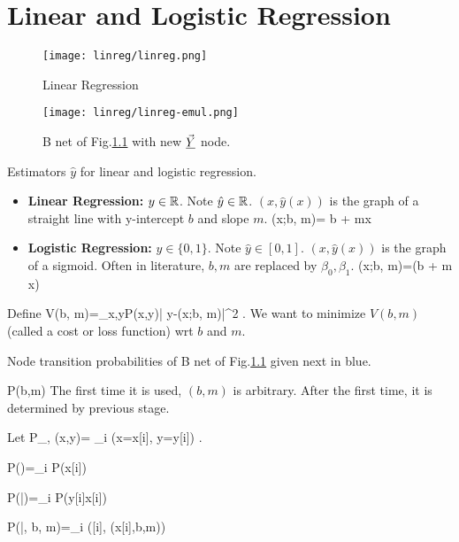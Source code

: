 \chapter{Linear and Logistic Regression}

\begin{figure}[h!]
\centering
\texttt{[image: linreg/linreg.png]}
\caption{Linear Regression} 
\label{fig-linreg}
\end{figure}

\begin{figure}[h!]
\centering
\texttt{[image: linreg/linreg-emul.png]}
\caption{B net of Fig.\ref{fig-linreg}  with new $\vec{\underline{Y}}$ node.}\label{fig-linreg-emul}
\end{figure}



Estimators $\hat{y}$ for linear and logistic regression.
\begin{itemize}
\item 

\textbf{Linear Regression:} $y\in { \mathbb{R}}$. 
Note $\hat{y}\in { \mathbb{R}}$. $(x,\hat{y}(x))$ is
the graph
of a straight line 
with y-intercept $b$ and slope $m$.
\beq
{}(x;b, m)= b + mx
\eeq

\item
\textbf{Logistic Regression:} $y\in\{0, 1\}$. Note $\hat{y}\in [0,1]$. $
(x,\hat{y}(x))$ is the graph
of a sigmoid.
 Often in literature, $b,m$ are replaced by $\beta_0, \beta_1$. 
\beq
{}(x;b, m)=\sig(b + m x)
\eeq
\end{itemize}

Define
\beq
V(b, m)=\sum_{x,y}P(x,y)| y-(x;b, m)|^2
\;.\label{eq-norm-cost}
\eeq
We want to minimize $V(b,m)$ (called a cost or loss function) wrt $b$ and $m$.


Node transition probabilities of B net of Fig.\ref{fig-linreg} given next in blue.

\beq\color{blue}
P(b,m) 
\eeq
The first time it is used, 
$(b,m)$ is arbitrary.
After the first time, it is determined 
by previous stage.

Let 
\beq
P_{\rvx, \rvy}(x,y)=
\sum_i \indi(x=x[i], y=y[i])
\;.
\eeq

\beq\color{blue}
P(\vecx)=\prod_i P(x[i])
\eeq

\beq\color{blue}
P(\vecy|\vecx)=\prod_i P(y[i]\cond x[i])
\eeq

\beq\color{blue}
P(|\vecx, b, m)=\prod_i \delta([i], (x[i],b,m))
\label{eq-replace1}
\eeq

